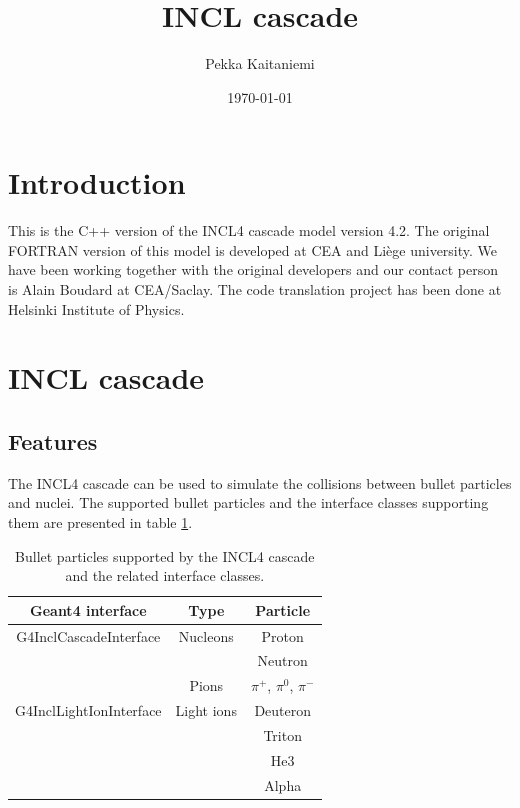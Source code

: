 \documentclass[12pt,a4paper]{article}
\title{INCL cascade}
\author{Pekka Kaitaniemi}
\date{\today}
\begin{document}
\maketitle

\section{Introduction}

This is the C++ version of the INCL4 cascade model version 4.2. The
original FORTRAN version of this model is developed at CEA \cite{cea}
and Li\`ege \cite{liegeuniversity} university. We have been working
together with the original developers and our contact person is Alain
Boudard at CEA/Saclay. The code translation project has been done at
Helsinki Institute of Physics.

\section{INCL cascade}

\subsection{Features}

The INCL4 cascade can be used to simulate the collisions between
bullet particles and nuclei. The supported bullet particles and the
interface classes supporting them are presented in table
\ref{tbl:bullets}.

\begin{table}
\caption{Bullet particles supported by the INCL4 cascade and the
  related interface classes.}
\label{tbl:bullets}
\begin{center}
\begin{tabular}{|c|c|c|}
\hline
Geant4 interface & Type & Particle \\
\hline
G4InclCascadeInterface & Nucleons & Proton \\
 &                                & Neutron \\
 &                       Pions    & $\pi^+$, $\pi^0$, $\pi^-$ \\
\hline
G4InclLightIonInterface & Light ions & Deuteron \\
 &                                    & Triton \\
 &                                    & He3 \\
 &                                     & Alpha \\
\hline
\end{tabular}
\end{center}
\end{table}
\end{document}
